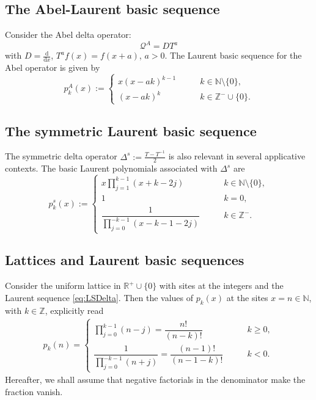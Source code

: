 \documentclass[10pt]{amsart}
\numberwithin{equation}{section}
\theoremstyle{definition}
\begin{document}
\subsection{The Abel-Laurent basic sequence}
\label{sec3.4}

Consider the Abel delta operator:
\begin{equation}
\mathcal{Q}^{A}=DT^{a}
\label{eq3.8}
\end{equation}
with $D=\frac{\mathrm{d}}{\mathrm{d}x}$, $T^a f(x)=f(x+a)$, $a>0$.
The Laurent basic sequence for the Abel operator is given by
\begin{equation}
p^{A}_{k}(x):=
\begin{cases}
x(x-ak)^{k-1} &\qquad k\in \mathbb{N}\setminus \{0\},
\\
(x-ak)^{k} &\qquad k \in \mathbb{Z}^{-}\cup\{0\}.
\end{cases}
\label{eq3.9}
\end{equation}

\subsection{The symmetric Laurent basic sequence}
\label{sec3.5}

The symmetric delta operator $\Delta ^{s}:= \frac{T-T^{-1}}{2}$ is also
relevant in several applicative contexts. The basic Laurent polynomials
associated with $\Delta ^{s}$ are
\begin{equation}
p^{s}_{k}(x):=
\begin{cases}
x \prod_{j=1}^{k-1} (x + k - 2j) &\qquad k\in \mathbb{N}\setminus \{0\},
\\
1 &\qquad k = 0,
\\
\dfrac{1}{\prod_{j=0}^{-k-1} (x - k - 1 - 2j)} &\qquad k\in \mathbb{Z}^{-}.
\end{cases}
\label{eq3.10}
\end{equation}

\subsection{Lattices and Laurent basic sequences}
\label{sec3.6}

Consider the uniform lattice in $\mathbb{R}^{+}\cup \{0\}$ with sites at
the integers and the Laurent sequence  \eqref{eq:LSDelta}. Then the values
of $p_{k}(x)$ at the sites $x=n\in \mathbb{N}$, with
$k\in \mathbb{Z}$, explicitly read
\begin{eqnarray*}
p_{k}(n)=
\begin{cases}
\prod _{j=0}^{k-1}(n-j)=\dfrac{n!}{(n-k)!} & \qquad k\ge 0,
\\[15pt]
\dfrac{1}{\prod _{j=0}^{-k-1}(n+j)}=\dfrac{(n-1)!}{(n-1-k)!} &
\qquad k< 0.
\end{cases}
\end{eqnarray*}
Hereafter, we shall assume that negative factorials in the denominator
make the fraction vanish.
\end{document}
